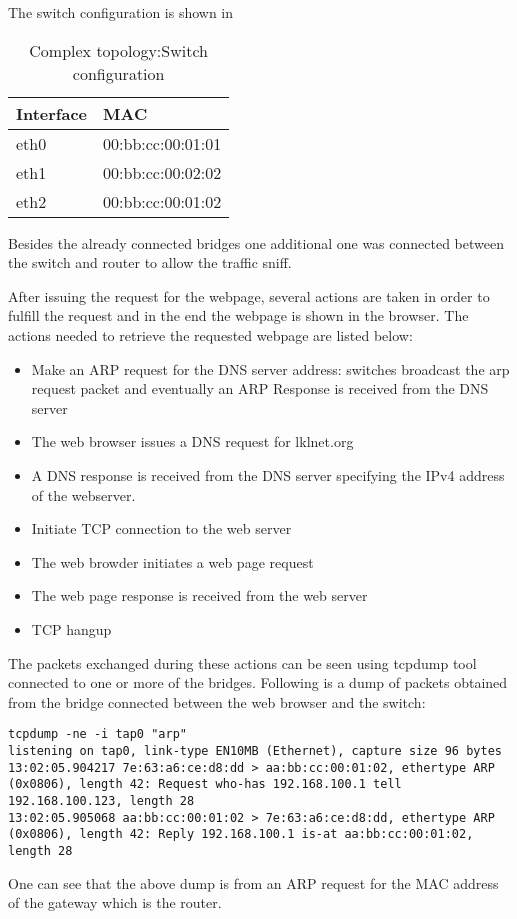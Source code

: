 The switch configuration is shown in 
\begin{center}
  \begin{table}[htb]
  \begin{center}
  \begin{tabular}{| l | l |}
    \hline
	Interface & MAC\\ \hline
	eth0 & 00:bb:cc:00:01:01\\ \hline
	eth1 & 00:bb:cc:00:02:02\\ \hline
	eth2 & 00:bb:cc:00:01:02\\
    \hline
  \end{tabular}
  \end{center}
  \caption{Complex topology:Switch configuration}
  \label{table:complex-switch}
  \end{table}
\end{center}
Besides the already connected bridges one additional one was connected between the switch and router to allow the traffic sniff.

After issuing the request for the webpage, several actions are taken in order to fulfill the request and in the end the webpage is shown in the browser.
The actions needed to retrieve the requested webpage are listed below:
\begin{itemize}
	\item Make an ARP request for the DNS server address: switches broadcast the arp request packet and eventually an ARP Response is received from the DNS server
	\item The web browser issues a  DNS request for lklnet.org
	\item A DNS response is received from the DNS server specifying the IPv4 address of the webserver.
	\item Initiate TCP connection to the web server
	\item The web browder initiates a web page request
	\item The web page response is received from the web server
	\item TCP hangup
\end{itemize}
The packets exchanged during these actions can be seen using tcpdump tool connected to one or more of the bridges.
Following is a dump of packets obtained from the bridge connected between the web browser and the switch:
\lstset{language=TeX,caption=,label=tcpdump}
\begin{lstlisting}
tcpdump -ne -i tap0 "arp"
listening on tap0, link-type EN10MB (Ethernet), capture size 96 bytes
13:02:05.904217 7e:63:a6:ce:d8:dd > aa:bb:cc:00:01:02, ethertype ARP (0x0806), length 42: Request who-has 192.168.100.1 tell 192.168.100.123, length 28
13:02:05.905068 aa:bb:cc:00:01:02 > 7e:63:a6:ce:d8:dd, ethertype ARP (0x0806), length 42: Reply 192.168.100.1 is-at aa:bb:cc:00:01:02, length 28
\end{lstlisting}
One can see that the above dump is from an ARP request for the MAC address of the gateway which is the router. 


